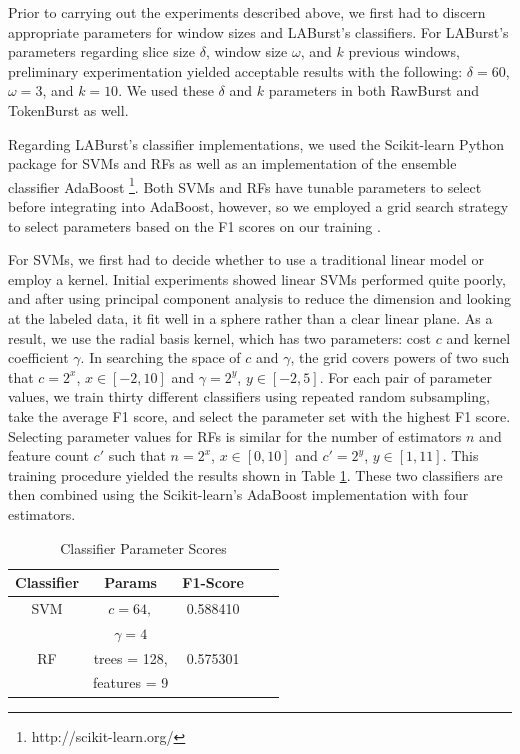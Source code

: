 \documentclass[letterpaper]{article}
\begin{document}
Prior to carrying out the experiments described above, we first had to discern appropriate parameters for window sizes and LABurst's classifiers.
For LABurst's parameters regarding slice size $\delta$, window size $\omega$, and $k$ previous windows, preliminary experimentation yielded acceptable results with the following: $\delta = 60$, $\omega = 3$, and $k=10$.
We used these $\delta$ and $k$ parameters in both RawBurst and TokenBurst as well.

Regarding LABurst's classifier implementations, we used the Scikit-learn Python package for SVMs and RFs as well as an implementation of the ensemble classifier AdaBoost  \footnote{http://scikit-learn.org/}.
Both SVMs and RFs have tunable parameters to select before integrating into AdaBoost, however, so we employed a grid search strategy to select parameters based on the F1 scores on our training .

For SVMs, we first had to decide whether to use a traditional linear model or employ a kernel.
Initial experiments showed linear SVMs performed quite poorly, and after using principal component analysis to reduce the dimension and looking at the labeled data, it fit well in a sphere rather than a clear linear plane. 
As a result, we use the radial basis kernel, which has two parameters: cost $c$ and kernel coefficient $\gamma$.
In searching the space of $c$ and $\gamma$, the grid covers powers of two such that $c = 2^x$, $x \in [-2, 10]$ and $\gamma = 2^y$, $y \in [-2, 5]$.
For each pair of parameter values, we train thirty different classifiers using repeated random subsampling, take the average F1 score, and select the parameter set with the highest F1 score.
Selecting parameter values for RFs is similar for the number of estimators $n$ and feature count $c'$ such that $n = 2^x$, $x \in [0, 10]$ and $c' = 2^y$, $y \in [1, 11]$.
This training procedure yielded the results shown in Table \ref{tab:scores}.
These two classifiers are then combined using the Scikit-learn's AdaBoost implementation with four estimators.

\begin{table}[htdp]
\footnotesize
\caption{Classifier Parameter Scores}
\begin{center}
\begin{tabular}{|c|c|c|c|c|}
\hline
\textbf{Classifier} & \textbf{Params} & \textbf{F1-Score} \\ \hline
SVM & $c=64,$ & 0.588410 \\ 
& $\gamma=4$ & \\ \hline
RF & trees = 128, & 0.575301 \\
& features = 9 &  \\ \hline
\end{tabular}
\end{center}
\label{tab:scores}
\end{table}
\end{document}
